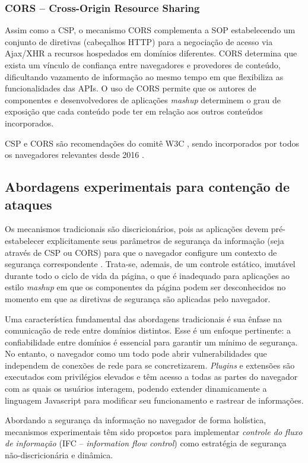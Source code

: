\subsubsection{CORS -- Cross-Origin Resource Sharing}
Assim como a CSP, o mecanismo CORS \cite{W3C:CORS} complementa a SOP estabelecendo um conjunto de diretivas (cabeçalhos HTTP) para a negociação de acesso via Ajax/XHR a recursos hospedados em domínios diferentes. CORS determina que exista um vínculo de confiança entre navegadores e provedores de conteúdo, dificultando vazamento de informação ao mesmo tempo em que flexibiliza as funcionalidades das APIs. O uso de CORS permite que os autores de componentes e desenvolvedores de aplicações \textit{mashup} determinem o grau de exposição que cada conteúdo pode ter em relação aos outros conteúdos incorporados.

CSP e CORS são recomendações do comitê W3C \cite{W3C:CSP} \cite{W3C:CORS}, sendo incorporados por todos os navegadores relevantes desde 2016 \cite{CanIUse:CSP} \cite{CanIUse:CORS}.


\subsection{Abordagens experimentais para contenção de ataques}
Os mecanismos tradicionais são discricionários, pois as aplicações devem pré-estabelecer explicitamente seus parâmetros de segurança da informação (seja através de CSP ou CORS) para que o navegador configure um contexto de segurança correspondente \cite[p. 31]{stefan:2015:phdthesis}. Trata-se, ademais, de um controle estático, imutável durante todo o ciclo de vida da página, o que é inadequado para aplicações ao estilo \textit{mashup} em que os componentes da página podem ser desconhecidos no momento em que as diretivas de segurança são aplicadas pelo navegador.

Uma característica fundamental das abordagens tradicionais é sua ênfase na comunicação de rede entre domínios distintos. Esse é um enfoque pertinente: a confiabilidade entre domínios é essencial para garantir um mínimo de segurança. No entanto, o navegador como um todo pode abrir vulnerabilidades que independem de conexões de rede para se concretizarem. \textit{Plugins} e extensões são executados com privilégios elevados e têm acesso a todas as partes do navegador com as quais os usuários interagem, podendo extender dinamicamente a linguagem Javascript para modificar seu funcionamento e rastrear de informações.

Abordando a segurança da informação no navegador de forma holística, mecanismos experimentais têm sido propostos para implementar \textit{controle do fluxo de informação} (IFC -- \textit{information flow control}) como estratégia de segurança não-discricionária e dinâmica.


